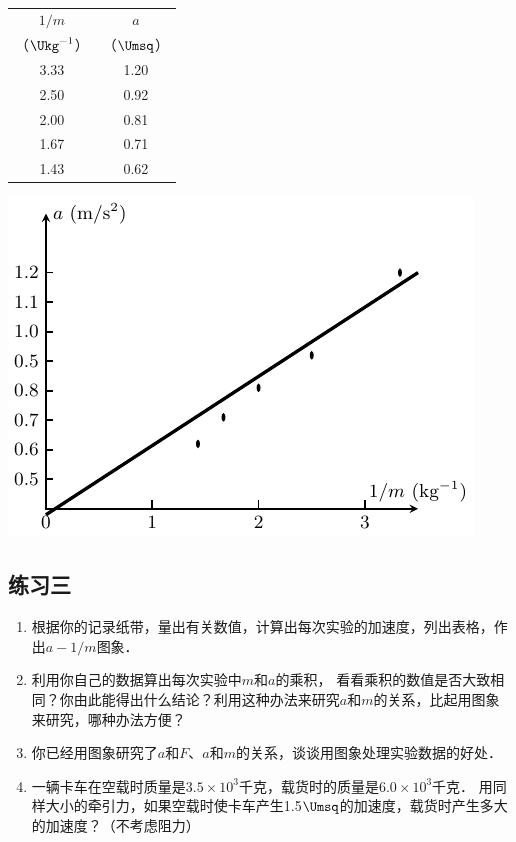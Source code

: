 \begin{table}[htbp]
	\centering
	\begin{minipage}[b]{0.45\linewidth}
		\centering
		\begin{tabular}{cc}
			\hline
			$1/m$  & $a$ \\
			（$\Ukg^{-1}$）&（$\Umsq$）\\
			\hline
			3.33  &  1.20  \\
			2.50  &  0.92  \\
			2.00  &  0.81  \\
			1.67  &  0.71  \\
			1.43  &  0.62  \\
			\hline
		\end{tabular}
		\caption{}\label{tab_A_3-3}
	\end{minipage}
	\hfil
	\begin{minipage}[b]{0.45\linewidth}
		\centering
		\includegraphics{fig/A/3-6.pdf}
		\label{fig_A_3-6}
	\end{minipage}
\end{table}





\subsection*{练习三}
\begin{enumerate}
	\item 根据你的记录纸带，量出有关数值，计算出每次实验的加速度，列出表格，作出$a-1/m$图象．
\item 利用你自己的数据算出每次实验中$m$和$a$的乘积，
看看乘积的数值是否大致相同？你由此能得出什么结论？利用这种办法来研究$a$和$m$的关系，比起用图象来研究，哪种办法方便？
\item 你已经用图象研究了$a$和$F$、$a$和$m$的关系，谈谈用图象处理实验数据的好处．
\item 一辆卡车在空载时质量是$3.5\times 10^3$千克，载货时的质量是$6.0\times 10^3$千克．
用同样大小的牵引力，如果空载时使卡车产生1.5$\Umsq$的加速度，载货时产生多大的加速度？（不考虑阻力）
\end{enumerate}

